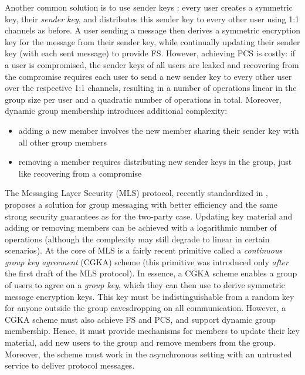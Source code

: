 Another common solution is to use sender keys \cite{sender-keys}: every user creates a symmetric key, their \emph{sender key}, and distributes this sender key to every other user using 1:1 channels as before. A user sending a message then derives a symmetric encryption key for the message from their sender key, while continually updating their sender key (with each sent message) to provide FS. However, achieving PCS is costly: if a user is compromised, the sender keys of all users are leaked and recovering from the compromise requires each user to send a new sender key to every other user over the respective 1:1 channels, resulting in a number of operations linear in the group size per user and a quadratic number of operations in total. Moreover, dynamic group membership introduces additional complexity:
\begin{itemize}
	\item adding a new member involves the new member sharing their sender key with all other group members
	\item removing a member requires distributing new sender keys in the group, just like recovering from a compromise
\end{itemize}
The Messaging Layer Security (MLS) protocol, recently standardized in \cite{rfc9420}, proposes a solution for group messaging with better efficiency and the same strong security guarantees as for the two-party case. Updating key material and adding or removing members can be achieved with a logarithmic number of operations (although the complexity may still degrade to linear in certain scenarios). At the core of MLS is a fairly recent primitive called a \emph{continuous group key agreement} (CGKA) scheme \cite{rtreekem} (this primitive was introduced only \emph{after} the first draft of the MLS protocol). In essence, a CGKA scheme enables a group of users to agree on a \emph{group key}, which they can then use to derive symmetric message encryption keys. This key must be indistinguishable from a random key for anyone outside the group eavesdropping on all communication. However, a CGKA scheme must also achieve FS and PCS, and support dynamic group membership. Hence, it must provide mechanisms for members to update their key material, add new users to the group and remove members from the group. Moreover, the scheme must work in the asynchronous setting with an untrusted service to deliver protocol messages.

